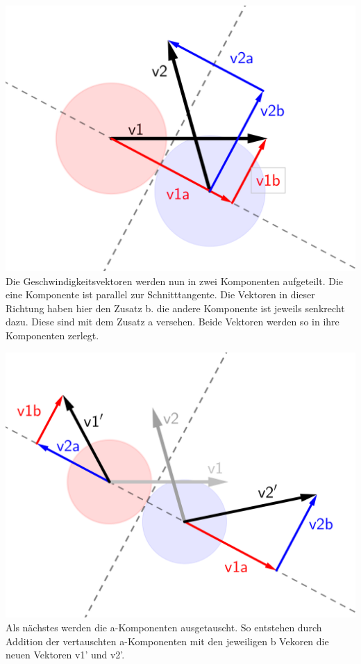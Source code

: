 \documentclass[12pt,a4paper]{scrartcl}
\begin{document}
\begin{center}
\includegraphics[scale=0.8]{img/Elastischer_stoss_3.png} \\
Die Geschwindigkeitsvektoren werden nun in zwei Komponenten aufgeteilt. Die eine Komponente ist parallel zur Schnitttangente. Die Vektoren in dieser Richtung haben hier den Zusatz b.
die andere Komponente ist jeweils senkrecht dazu.
Diese sind mit dem Zusatz a versehen.
Beide Vektoren werden so in ihre Komponenten zerlegt.
\end{center}

\begin{center}
\includegraphics[scale=0.8]{img/Elastischer_stoss_4.png} \\
Als nächstes werden die a-Komponenten ausgetauscht.
So entstehen durch Addition der vertauschten a-Komponenten mit den jeweiligen b Vekoren die neuen Vektoren v1' und v2'.
\end{center}
\end{document}
